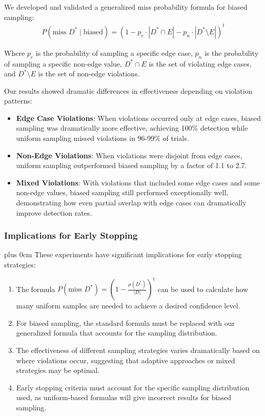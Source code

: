 \documentclass[11pt,a4paper]{article}
\newcommand{\justifytext}{\leftskip=0pt \rightskip=0pt plus 0cm}
\begin{document}
We developed and validated a generalized miss probability formula for biased sampling:
\begin{align}
P(\text{miss }D^* \mid \text{biased}) = \left(1 - p_e\cdot|D^*\cap E| - p_n\cdot|D^*\setminus E|\right)^t
\end{align}

Where $p_e$ is the probability of sampling a specific edge case, $p_n$ is the probability of sampling a specific non-edge value, $D^*\cap E$ is the set of violating edge cases, and $D^*\setminus E$ is the set of non-edge violations.

Our results showed dramatic differences in effectiveness depending on violation patterns:

\begin{itemize}
\item \textbf{Edge Case Violations}: When violations occurred only at edge cases, biased sampling was dramatically more effective, achieving 100\% detection while uniform sampling missed violations in 96-99\% of trials.

\item \textbf{Non-Edge Violations}: When violations were disjoint from edge cases, uniform sampling outperformed biased sampling by a factor of 1.1 to 2.7.

\item \textbf{Mixed Violations}: With violations that included some edge cases and some non-edge values, biased sampling still performed exceptionally well, demonstrating how even partial overlap with edge cases can dramatically improve detection rates.
\end{itemize}

\subsubsection{Implications for Early Stopping}

\justifytext
These experiments have significant implications for early stopping strategies:

\begin{enumerate}
\item The formula $P(\text{miss }D^*) = \left(1 - \frac{\mu(D^*)}{|D|}\right)^t$ can be used to calculate how many uniform samples are needed to achieve a desired confidence level.

\item For biased sampling, the standard formula must be replaced with our generalized formula that accounts for the sampling distribution.

\item The effectiveness of different sampling strategies varies dramatically based on where violations occur, suggesting that adaptive approaches or mixed strategies may be optimal.

\item Early stopping criteria must account for the specific sampling distribution used, as uniform-based formulas will give incorrect results for biased sampling.
\end{enumerate}
\end{document}
